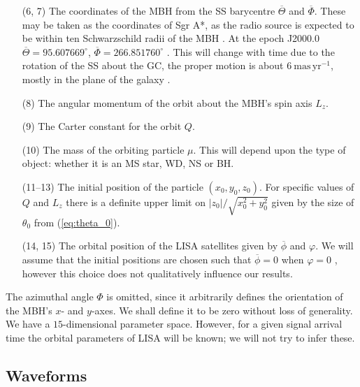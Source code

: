 \documentclass[useAMS,usedcolumn,usegraphicx,usenatbib]{mn2e}
\newcommand{\eqnref}[1]{(\ref{eq:#1})}
\newcommand{\units}[1]{\ensuremath{~\mathrm{#1}}}
\begin{document}
\begin{enumerate}
\item[(6, 7)] The coordinates of the MBH from the SS barycentre $\overline{\Theta}$ and $\overline{\Phi}$. These may be taken as the coordinates of Sgr A*, as the radio source is expected to be within ten Schwarzschild radii of the MBH \citep{Reid2003,Doeleman2008}. At the epoch J2000.0 $\overline{\Theta} = {95.607669}^{\circ}$, $\overline{\Phi} = {266.851760}^{\circ}$ \citep{Reid1999}. This will change with time due to the rotation of the SS about the GC, the proper motion is about $6\units{mas\,yr^{-1}}$, mostly in the plane of the galaxy \citep{Reid1999, Backer1999, Reid2003}.
\item[(8)] The angular momentum of the orbit about the MBH's spin axis $L_z$.
\item[(9)] The Carter constant for the orbit $Q$.
\item[(10)] The mass of the orbiting particle $\mu$. This will depend upon the type of object: whether it is an MS star, WD, NS or BH.
\item[(11--13)] The initial position of the particle $(x_0, y_0, z_0)$. For specific values of $Q$ and $L_z$ there is a definite upper limit on $|z_0|/\sqrt{x_0^2+y_0^2}$ given by the size of $\theta_0$ from \eqnref{theta_0}.
\item[(14, 15)] The orbital position of the LISA satellites given by $\overline{\phi}$ and $\varphi$. We will assume that the initial positions are chosen such that $\overline{\phi} = 0$ when $\varphi = 0$ \citep{Cutler1998}, however this choice does not qualitatively influence our results.\\
\end{enumerate}%
The azimuthal angle $\Phi$ is omitted, since it arbitrarily defines the orientation of the MBH's $x$- and $y$-axes. We shall define it to be zero without loss of generality. We have a $15$-dimensional parameter space. However, for a given signal arrival time the orbital parameters of LISA will be known; we will not try to infer these.

\subsection{Waveforms}
\end{document}
